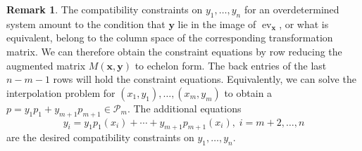\documentclass[12pt]{article}
\theoremstyle{definition}
\newtheorem{remark}[proposition]{Remark}
\newcommand{\bx}{\mathbf{x}}
\newcommand{\by}{\mathbf{y}}
\newcommand{\ev}{\operatorname{ev}}
\newcommand{\cP}{\mathcal{P}}
\begin{document}
\begin{remark}
The compatibility constraints on
$y_1,\ldots, y_n$ for an overdetermined system amount to the condition
that $\by$ lie in the image of $\ev_{\bx}$, or what is equivalent,
belong to the column space of the corresponding transformation matrix.
We can therefore obtain the constraint equations by row reducing the
augmented matrix $M(\bx,\by)$ to echelon form.  The back entries of
the last $n-m-1$ rows will hold the constraint equations.
Equivalently, we can solve the interpolation problem for
$(x_1,y_1),\ldots, (x_m,y_m)$ to obtain a $p=y_1 p_1 + y_{m+1}
p_{m+1}\in \cP_m$.  The additional equations
\[ y_i = y_1 p_1(x_i)+\cdots + y_{m+1} p_{m+1}(x_i),\; i=m+2,\ldots,
n\] are the desired compatibility constraints on $y_1,\ldots, y_n$.
  
\end{remark}

\end{document}
